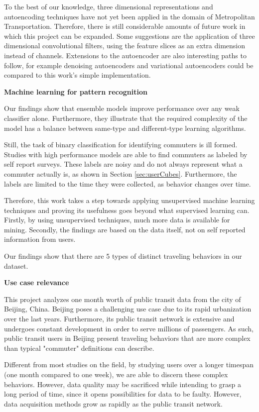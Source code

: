 \documentclass{article}
\begin{document}
To the best of our knowledge, three dimensional representations and autoencoding techniques have not yet been applied in the domain of Metropolitan Transportation. Therefore, there is still considerable amounts of future work in which this project can be expanded. Some suggestions are the application of three dimensional convolutional filters, using the feature slices as an extra dimension instead of channels. Extensions to the autoencoder are also interesting paths to follow, for example denoising autoencoders and variational autoencoders could be compared to this work's simple implementation.

\textbf{Machine learning for pattern recognition}

Our findings show that ensemble models improve performance over any weak classifier alone. Furthermore, they illustrate that the required complexity of the model has a balance between same-type and different-type learning algorithms. 

Still, the task of binary classification for identifying commuters is ill formed. Studies with high performance models are able to find commuters as labeled by self report surveys. These labels are noisy and do not always represent what a commuter actually is, as shown in Section \ref{sec:userCubes}. Furthermore, the labels are limited to the time they were collected, as behavior changes over time.  

Therefore, this work takes a step towards applying unsupervised machine learning techniques and proving its usefulness goes beyond what supervised learning can. Firstly, by using unsupervised techniques, much more data is available for mining. Secondly, the findings are based on the data itself, not on self reported information from users. 

Our findings show that there are 5 types of distinct traveling behaviors in our dataset. 
 
 
 
\textbf{Use case relevance}

This project analyzes one month worth of public transit data from the city of Beijing, China. Beijing poses a challenging use case due to its rapid urbanization over the last years. Furthermore, its public transit network is extensive and undergoes constant development in order to serve millions of passengers. As such, public transit users in Beijing present traveling behaviors that are more complex than typical "commuter" definitions can describe. 

Different from most studies on the field, by studying users over a longer timespan (one month compared to one week), we are able to discern these complex behaviors. However, data quality may be sacrificed while intending to grasp a long period of time, since it opens possibilities for data to be faulty. However, data acquisition methods grow as rapidly as the public transit network. 
\end{document}
